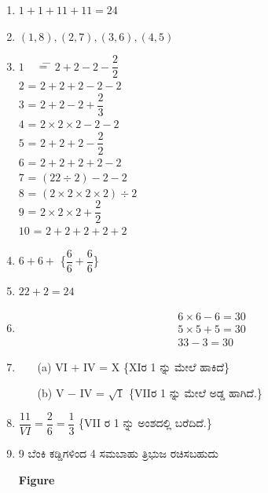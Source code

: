 \begin{enumerate}
\item $1 + 1 + 11 + 11 = 24$
\item $(1, 8), (2, 7), (3, 6), (4, 5)$

\smallskip
\item 
\begin{tabbing}
$1$ ~~\= = \= $2 + 2 - 2 - \dfrac{2}{2}$\\[0.1cm]
$2$ \> = \> $2 + 2 + 2 - 2 - 2$\\[0.1cm]
$3$\> = \> $2 + 2 - 2 + \dfrac{2}{3}$\\[0.1cm]
$4$ \> = \> $2 \times 2 \times 2 - 2 - 2$\\[0.1cm]
$5$ \> = \> $2 + 2 + 2 - \dfrac{2}{2}$\\[0.1cm]
$6$ \> = \> $2 + 2 + 2 + 2 - 2$\\[0.1cm]
$7$ \> = \> $(22 \div 2) - 2 - 2$\\[0.1cm]
$8$ \> = \> $(2 \times 2 \times 2 \times 2) \div 2$\\[0.1cm]
$9$ \> = \> $2 \times 2 \times 2 + \dfrac{2}{2}$\\[0.1cm]
$10$ \> = \> $2 + 2 + 2 + 2 + 2$
\end{tabbing}

\item $6 + 6 +$ \{$\dfrac{6}{6} + \dfrac{6}{6}$\}

\item $22 + 2 = 24$

\item 
\begin{align*}
& 6 \times 6 - 6 = 30\\
& 5 \times 5 + 5 = 30\\
& 33 - 3 = 30
\end{align*}

\item 
\begin{itemize}
\item[(a)] VI $+$ IV = X \{XIರ 1 ನ್ನು ಮೇಲೆ ಹಾಕಿದೆ\}
\item[(b)] V $-$ IV = $\sqrt{1}$ \{VIIರ 1 ನ್ನು ಮೇಲೆ ಅಡ್ಡ ಹಾಗಿದೆ.\}
\end{itemize}

\item $\dfrac{11}{VI} = \dfrac{2}{6} = \dfrac{1}{3}$ \{VII ರ 1 ನ್ನು ಅಂಶದಲ್ಲಿ ಬರೆದಿದೆ.\}

\item 9 ಬೆಂಕಿ ಕಡ್ಡಿಗಳಿಂದ 4 ಸಮಬಾಹು ತ್ರಿಭುಜ ರಚಿಸಬಹುದು 
\begin{center}
{\bf Figure}
\end{center}


\end{enumerate}
